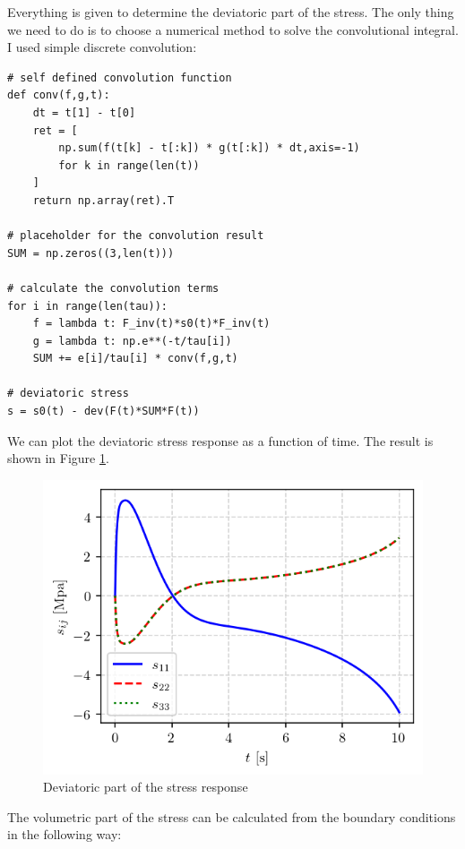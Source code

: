 \documentclass[12pt,a4paper]{article}
\begin{document}
Everything is given to determine the deviatoric part of the stress. The only thing we need to do is to choose a numerical method to solve the convolutional integral. I used simple discrete convolution:

\lstset{style=python}
\begin{lstlisting}
# self defined convolution function
def conv(f,g,t):
    dt = t[1] - t[0]
    ret = [
        np.sum(f(t[k] - t[:k]) * g(t[:k]) * dt,axis=-1) 
        for k in range(len(t))
    ]
    return np.array(ret).T

# placeholder for the convolution result
SUM = np.zeros((3,len(t)))

# calculate the convolution terms
for i in range(len(tau)):
    f = lambda t: F_inv(t)*s0(t)*F_inv(t)
    g = lambda t: np.e**(-t/tau[i])
    SUM += e[i]/tau[i] * conv(f,g,t)

# deviatoric stress
s = s0(t) - dev(F(t)*SUM*F(t))
\end{lstlisting}

\newpage

We can plot the deviatoric stress response as a function of time. The result is shown in Figure \ref{fig:viscoelastic_stress}.
\begin{figure}[H]
    \centering
    \includegraphics[scale=1]{figures/deviatoric_response.png}
    \caption{Deviatoric part of the stress response}
    \label{fig:viscoelastic_stress}
\end{figure}

The volumetric part of the stress can be calculated from the boundary conditions in the following way:
\end{document}
